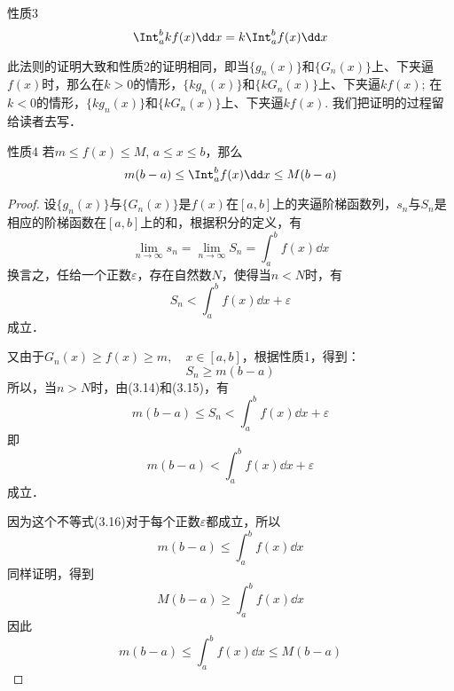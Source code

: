 \begin{blk}{性质3}
\[\Int^b_a kf(x)\dd x =k\Int^b_a f(x)\dd x \]
\end{blk}

此法则的证明大致和性质2的证明相同，即当$\{g_n(x)\}$和$\{G_n(x)\}$上、下夹逼$f(x)$时，那么在$k>0$的情形，$\{kg_n(x)\}$和$\{kG_n(x)\}$上、下夹逼$kf(x)$; 在$k<0$的情形，$\{kg_n(x)\}$和$\{kG_n(x)\}$上、下夹逼$kf(x)$. 我们把证明的过程留给读者去写．

\begin{blk}{性质4}
    若$m\le f(x)\le M$, $a\le x\le b$，那么
    \[m(b-a)\le \Int^b_a f(x)\dd x \le M(b-a) \]
    \end{blk}

\begin{proof}
    设$\{g_n(x)\}$与$\{G_n(x)\}$是$f(x)$在$[a,b]$上的夹逼阶梯函数列，$s_n$与$S_n$是相应的阶梯函数在$[a,b]$上的和，根据积分的定义，有
\[\lim_{n\to\infty}s_n=\lim_{n\to\infty}S_n=\int^b_a f(x)\dd x\]
换言之，任给一个正数$\varepsilon$，存在自然数$N$，使得当$n<N$时，有
\begin{equation}
    S_n<\int^b_a f(x)\dd x+\varepsilon
\end{equation}
成立．

又由于$G_n(x)\ge f(x)\ge m,\quad x\in[a,b]$，根据性质1，得到：
\begin{equation}
    S_n\ge m(b-a)
\end{equation}
所以，当$n>N$时，由(3.14)和(3.15)，有
\[m(b-a)\le S_n<\int^b_a f(x)\dd x+\varepsilon\]
即
\begin{equation}
    m(b-a)<\int^b_a f(x)\dd x+\varepsilon
\end{equation}
成立．

因为这个不等式(3.16)对于每个正数$\varepsilon$都成立，所以
\[m(b-a)\le \int^b_a f(x)\dd x\]
同样证明，得到
\[M(b-a)\ge \int^b_a f(x)\dd x\]
因此
\[m(b-a)\le \int^b_a f(x)\dd x\le M(b-a)\]
\end{proof}

\begin{figure}[htp]
    \centering
{}
    \caption{}\label{fig:chapter3_sec2_y=f(x)_bounded}
\end{figure}


